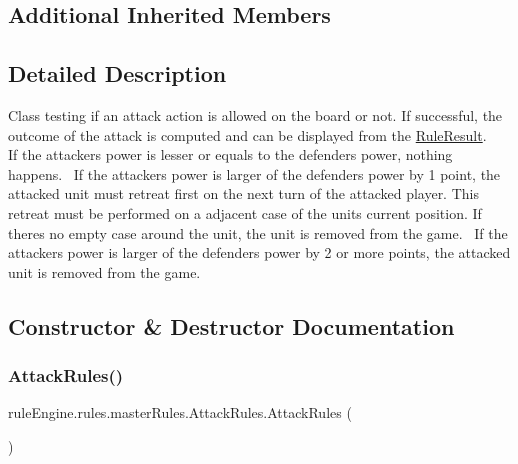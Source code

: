 \subsection*{Additional Inherited Members}


\subsection{Detailed Description}
Class testing if an attack action is allowed on the board or not. If successful, the outcome of the attack is computed and can be displayed from the \mbox{\hyperlink{classrule_engine_1_1_rule_result}{Rule\+Result}}.~\newline
 ~\newline
 If the attackers power is lesser or equals to the defenders power, nothing happens.~\newline
 If the attackers power is larger of the defenders power by 1 point, the attacked unit must retreat first on the next turn of the attacked player. This retreat must be performed on a adjacent case of the unit\textquotesingle{}s current position. If there\textquotesingle{}s no empty case around the unit, the unit is removed from the game.~\newline
 If the attackers power is larger of the defenders power by 2 or more points, the attacked unit is removed from the game. 

\subsection{Constructor \& Destructor Documentation}
\mbox{\label{classrule_engine_1_1rules_1_1master_rules_1_1_attack_rules_abff281f832282088921c75c1c35a9310}} 
\subsubsection{\texorpdfstring{Attack\+Rules()}{AttackRules()}}
{\footnotesize\ttfamily rule\+Engine.\+rules.\+master\+Rules.\+Attack\+Rules.\+Attack\+Rules (\begin{DoxyParamCaption}{ }\end{DoxyParamCaption})\hspace{0.3cm}{\ttfamily [inline]}}

